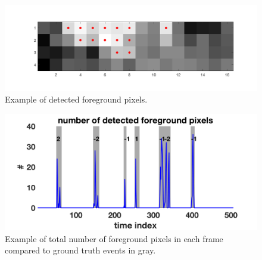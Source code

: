 \documentclass[12pt,oneside]{article} %
\begin{document}
\begin{figure}[htb] 
\centering
\includegraphics[scale=0.45]{images/foreground_example.png}
\caption{Example of detected foreground pixels.}
\label{foregroundexample}
\end{figure}

\begin{figure}[!htb]  %
\centering
\includegraphics[scale=0.45]{images/abs_example.png}
\caption{Example of total number of foreground pixels in each frame compared to 
ground truth events in gray.}
\label{abs_example}
\end{figure}
\end{document}

